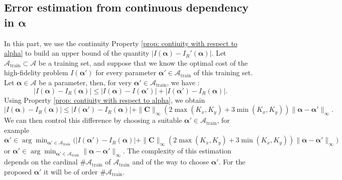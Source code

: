 \documentclass{article}
\def\cA{\mathcal{A}}
\def\aalpha{\boldsymbol{\alpha}}
\def\CC{\mathbf{C}}
\begin{document}
\subsection{Error estimation from continuous dependency in \texorpdfstring{$\aalpha$}{}} \label{subsection: erorr estimation continuity}
%
In this part, we use the continuity Property \ref{prop: contiuity with respect to alpha} to build an upper bound of the quantity $|I(\aalpha) - I_R'(\aalpha)|$.
%
Let $\cA_{\text{train}} \subset \cA$ be a training set, and suppose that we know the optimal cost of the high-fidelity problem $I({\aalpha'})$ for every parameter $\aalpha' \in \cA_{\text{train}}$ of this training set.
%
Let $\aalpha \in \cA$ be a parameter, then, for very $\aalpha'\in \cA_{\text{train}}$, we have :
%
\begin{equation}
    |I(\aalpha) - I_R(\aalpha)| \leq |I(\aalpha) - I(\aalpha')| + |I(\aalpha') - I_R(\aalpha)|.
\end{equation}
%
Using Property \ref{prop: contiuity with respect to alpha}, we obtain
%
\begin{equation}
    |I(\aalpha) - I_R(\aalpha)| \leq |I(\aalpha') - I_R(\aalpha)| + \|\CC\|_\infty  (2 \max(K_x, K_y) + 3 \min(K_x, K_y)) \|\aalpha - \aalpha'\|_\infty.
\end{equation}
%
We can then control this difference by choosing a suitable $\aalpha' \in \cA_{\text{train}}$, for example $\displaystyle \aalpha' \in \arg\min_{\aalpha' \in \cA_{\text{train}}} \big( |I(\aalpha') - I_R(\aalpha)| + \|\CC\|_\infty  (2 \max(K_x, K_y) + 3 \min(K_x, K_y)) \|\aalpha - \aalpha'\|_\infty \big)$ or  $\displaystyle \aalpha' \in \arg\min_{\aalpha' \in \cA_{\text{train}}}  \|\aalpha - \aalpha'\|_\infty$.
%
The complexity of this estimation depends on the cardinal $\#\cA_{\text{train}}$ of $\cA_{\text{train}}$ and of the way to choose $\aalpha'$. For the proposed $\aalpha'$ it will be of order $\#\cA_{\text{train}}$.




\end{document}
